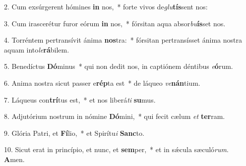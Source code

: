 2. Cum exsúrgerent hómines \textbf{in} nos,~*  forte vivos de\textit{glu}\textbf{tís}sent nos:\

3. Cum irascerétur furor eórum \textbf{in} nos,~*  fórsitan aqua absor\textit{bu}\textbf{ís}set nos.\

4. Torréntem pertransívit ánima \textbf{nos}tra:~*  fórsitan pertransísset ánima nostra aquam into\textit{le}\textbf{rá}bilem.\

5. Benedíctus \textbf{Dó}minus~*  qui non dedit nos, in captiónem déntibus \textit{e}\textbf{ó}rum.\

6. Anima nostra sicut passer e\textbf{rép}ta est~*  de láqueo \textit{ve}\textbf{nán}tium.\

7. Láqueus con\textbf{trí}tus est,~*  et nos liberá\textit{ti} \textbf{su}mus.\

8. Adjutórium nostrum in nómine \textbf{Dó}mini,~*  qui fecit cælum \textit{et} \textbf{ter}ram.\

9. Glória Patri, et \textbf{Fí}lio,~*  et Spirítu\textit{i} \textbf{Sanc}to.\

10. Sicut erat in princípio, et nunc, et \textbf{sem}per,~*  et in sǽcula sæculó\textit{rum}. \textbf{A}men.\

